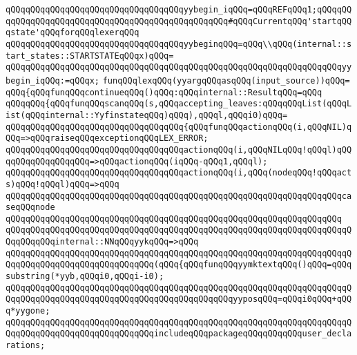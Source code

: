 \verb|qQQqqQQqqQQqqQQqqQQqqQQqqQQqqQQqqQQqyybegin_iqQQq=qQQqREFqQQq1;qQQqqQQqqQQqqQQqqQQqqQQqqQQqqQQqqQQqqQQqqQQqqQQqqQQq#qQQqCurrentqQQq'startqQQqstate'qQQqforqQQqlexerqQQq|\newline
\newline
\verb|qQQqqQQqqQQqqQQqqQQqqQQqqQQqqQQqqQQqyybeginqQQq=qQQq\\qQQq(internal::start_states::STARTSTATEqQQqx)qQQq=|\newline
\verb|qQQqqQQqqQQqqQQqqQQqqQQqqQQqqQQqqQQqqQQqqQQqqQQqqQQqqQQqqQQqqQQqqQQqyybegin_iqQQq:=qQQqx;|\newline
\newline
\verb|funqQQqlexqQQq(yyargqQQqasqQQq(input_source))qQQq=|\newline
\verb|qQQq{qQQqfunqQQqcontinueqQQq()qQQq:qQQqinternal::ResultqQQq=qQQq|\newline
\verb|qQQqqQQq{qQQqfunqQQqscanqQQq(s,qQQqaccepting_leaves:qQQqqQQqList(qQQqList(qQQqinternal::YyfinstateqQQq)qQQq),qQQql,qQQqi0)qQQq=|\newline
\verb|qQQqqQQqqQQqqQQqqQQqqQQqqQQqqQQqqQQq{qQQqfunqQQqactionqQQq(i,qQQqNIL)qQQq=>qQQqraiseqQQqexceptionqQQqLEX_ERROR;|\newline
\verb|qQQqqQQqqQQqqQQqqQQqqQQqqQQqqQQqqQQqactionqQQq(i,qQQqNILqQQq!qQQql)qQQqqQQqqQQqqQQqqQQq=>qQQqactionqQQq(iqQQq-qQQq1,qQQql);|\newline
\verb|qQQqqQQqqQQqqQQqqQQqqQQqqQQqqQQqqQQqactionqQQq(i,qQQq(nodeqQQq!qQQqacts)qQQq!qQQql)qQQq=>qQQq|\newline
\verb|qQQqqQQqqQQqqQQqqQQqqQQqqQQqqQQqqQQqqQQqqQQqqQQqqQQqqQQqqQQqqQQqqQQqcaseqQQqnode|\newline
\verb|qQQqqQQqqQQqqQQqqQQqqQQqqQQqqQQqqQQqqQQqqQQqqQQqqQQqqQQqqQQqqQQqqQQq|\newline
\verb|qQQqqQQqqQQqqQQqqQQqqQQqqQQqqQQqqQQqqQQqqQQqqQQqqQQqqQQqqQQqqQQqqQQqqQQqqQQqqQQqinternal::NNqQQqyykqQQq=>qQQq|\newline
\verb|qQQqqQQqqQQqqQQqqQQqqQQqqQQqqQQqqQQqqQQqqQQqqQQqqQQqqQQqqQQqqQQqqQQqqQQqqQQqqQQqqQQqqQQqqQQqqQQqqQQq(qQQq{qQQqfunqQQqyymktextqQQq()qQQq=qQQqsubstring(*yyb,qQQqi0,qQQqi-i0);|\newline
\verb|qQQqqQQqqQQqqQQqqQQqqQQqqQQqqQQqqQQqqQQqqQQqqQQqqQQqqQQqqQQqqQQqqQQqqQQqqQQqqQQqqQQqqQQqqQQqqQQqqQQqqQQqqQQqqQQqqQQqyyposqQQq=qQQqi0qQQq+qQQq*yygone;|\newline
\verb|qQQqqQQqqQQqqQQqqQQqqQQqqQQqqQQqqQQqqQQqqQQqqQQqqQQqqQQqqQQqqQQqqQQqqQQqqQQqqQQqqQQqqQQqqQQqqQQqqQQqincludeqQQqpackageqQQqqQQqqQQquser_declarations;|\newline
